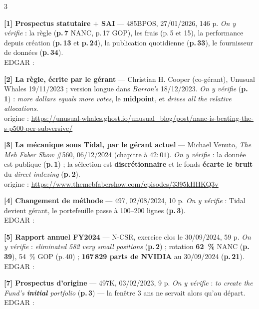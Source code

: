 \documentclass[9pt,a4paper]{extarticle}
\begin{document}
\begin{multicols}{3}\raggedright\sloppy\setlength{\parskip}{0.4pt}
{\scriptsize
\textbf{[1] Prospectus statutaire $+$ SAI} --- 485BPOS, 27/01/2026, 146 p. \emph{On y vérifie} : la règle (\textbf{p.\,7} NANC, p.\,17 GOP), les frais (p.\,5 et 15), la performance depuis création (\textbf{p.\,13} et \textbf{p.\,24}), la publication quotidienne (\textbf{p.\,33}), le fournisseur de données (\textbf{p.\,34}).\\
{\color{grisf}EDGAR :} 

\vspace{0.35mm}
\textbf{[2] La règle, écrite par le gérant} --- Christian H. Cooper (co-gérant), Unusual Whales 19/11/2023 ; version longue dans \emph{Barron's} 18/12/2023. \emph{On y vérifie} (\textbf{p.\,1}) : \og{}\emph{more dollars equals more votes}\fg{}, le \textbf{midpoint}, et \og{}\emph{drives all the relative allocations}\fg{}.\\
{\color{grisf}origine :} \url{https://unusual-whales.ghost.io/unusual_blog/post/nanc-is-beating-the-s-p500-per-subversive/}

\vspace{0.35mm}
\textbf{[3] La mécanique sous Tidal, par le gérant actuel} --- Michael Venuto, \emph{The Meb Faber Show} \#560, 06/12/2024 (chapitre à $42{:}01$). \emph{On y vérifie} : la donnée est publique (\textbf{p.\,1}) ; la sélection est \textbf{discrétionnaire} et le fonds \textbf{écarte le bruit} du \emph{direct indexing} (\textbf{p.\,2}).\\
{\color{grisf}origine :} \url{https://www.themebfabershow.com/episodes/3395kHHKQ3v}

\vspace{0.35mm}
\textbf{[4] Changement de méthode} --- 497, 02/08/2024, 10 p. \emph{On y vérifie} : Tidal devient gérant, le portefeuille passe à 100--200 lignes (\textbf{p.\,3}).\\
{\color{grisf}EDGAR :} 

\vspace{0.35mm}
\textbf{[5] Rapport annuel FY2024} --- N-CSR, exercice clos le 30/09/2024, 59 p. \emph{On y vérifie} : \og{}\emph{eliminated 582 very small positions}\fg{} (\textbf{p.\,2}) ; rotation \textbf{62~\%} NANC (\textbf{p.\,39}), 54~\% GOP (p.\,40) ; \textbf{167\,829 parts de NVIDIA} au 30/09/2024 (\textbf{p.\,21}).\\
{\color{grisf}EDGAR :} 

\vspace{0.35mm}
\textbf{[7] Prospectus d'origine} --- 497K, 03/02/2023, 9 p. \emph{On y vérifie} : \og{}\emph{to create the Fund's \textbf{initial} portfolio}\fg{} (\textbf{p.\,3}) --- la fenêtre 3 ans ne servait alors qu'au départ.\\
{\color{grisf}EDGAR :} 

}
\end{multicols}
\end{document}
